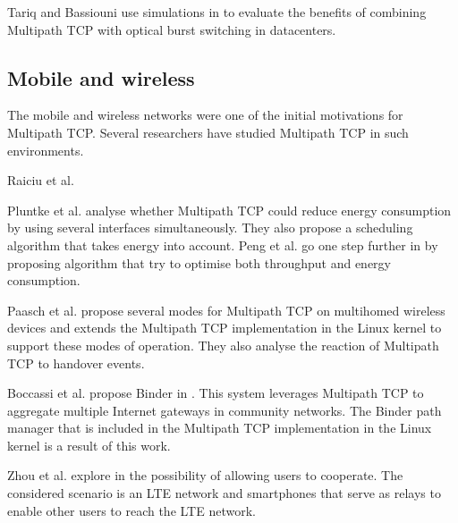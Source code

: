 Tariq and Bassiouni use simulations in \cite{Tariz_OBS:2014} to evaluate the benefits of combining Multipath TCP with optical burst switching in datacenters.

\subsection{Mobile and wireless}

The mobile and wireless networks were one of the initial motivations for Multipath TCP. Several researchers have studied Multipath TCP in such environments.

Raiciu et al. \cite{Raiciu_Opportunistic:2011} %

Pluntke et al. \cite{Pluntke_Saving:2011} analyse whether Multipath TCP could reduce energy consumption by using several interfaces simultaneously. They also propose a scheduling algorithm that takes energy into account. Peng et al. go one step further in  %
\cite{Peng_Energy:2014} by proposing algorithm that try to optimise both throughput and energy consumption. %

Paasch et al. \cite{Paasch_Exploring:2012} propose several modes for Multipath TCP on multihomed wireless devices and extends the Multipath TCP implementation in the Linux kernel to support these modes of operation. They also analyse the reaction of Multipath TCP to handover events. 

Boccassi et al. propose  Binder in \cite{Boccassi_Binder:2013}. This system leverages Multipath TCP to aggregate multiple Internet gateways in community networks. The Binder path manager that is included in the Multipath TCP implementation in the Linux kernel is a result of this work. %

Zhou et al. explore in \cite{Zhou_cooperation:2015} the possibility of allowing users to cooperate. The considered scenario is an LTE network and smartphones that serve as relays to enable other users to reach the LTE network.

